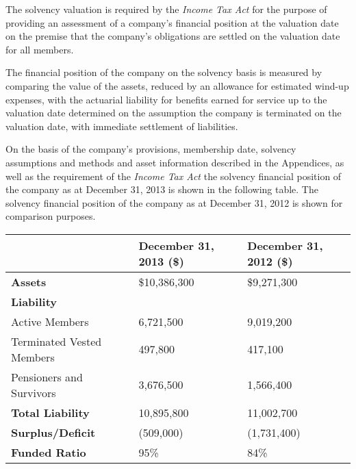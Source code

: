\documentclass{report}
\begin{document}
The solvency valuation is required by the \textit{Income Tax Act} for the purpose of providing an assessment of a company's financial position at the valuation date on the premise that the company's obligations are settled on the valuation date for all members. %

\vspace{3mm}
The financial position of the company on the solvency basis is measured by comparing the value of the assets, reduced by an allowance for estimated wind-up expenses, with the actuarial liability for benefits earned for service up to the valuation date determined on the assumption the company is terminated on the valuation date, with immediate settlement of liabilities.

\vspace{3mm}
On the basis of the company's provisions, membership date, solvency assumptions and methods and asset information described in the Appendices, as well as the requirement of the \textit{Income Tax Act} the solvency financial position of the company as at December 31, 2013 is shown in the following table. The solvency financial position of the company as at December 31, 2012 is shown for comparison purposes.

\vspace{3mm}
\bgroup
\normalsize
\def\arraystretch{1.5}
\begin{tabular}{p{5.0cm} p{4.5cm}  p{4.5cm}}
\hline
& \textbf{December 31, 2013 (\$)} & \textbf{December 31, 2012 (\$)} \\ \hline
\textbf{Assets} & \$10,386,300 & \$9,271,300 \\ 
\textbf{Liability} \\ 
 \hspace{3mm} Active Members & 6,721,500 & 9,019,200 \\ 
\vspace{-5mm}  \hspace{3mm} Terminated Vested Members & \vspace{-5mm} 497,800 & \vspace{-5mm} 417,100 \\ 
\vspace{-5mm}  \hspace{3mm} Pensioners and Survivors & \vspace{-5mm} 3,676,500 & \vspace{-5mm} 1,566,400 \\ 
\textbf{Total Liability} & 10,895,800 & 11,002,700 \\
\hline 
\textbf{Surplus/Deficit} & (509,000) & (1,731,400) \\ \hline
\textbf{Funded Ratio} & 95\% &  84\% \\ \hline
\end{tabular}
\egroup
\end{document}
